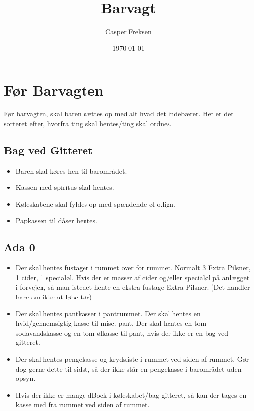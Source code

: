 

\title{Barvagt}
\date{\today}
\author{Casper Freksen}



\maketitle

\section{Før Barvagten}
\label{sec:pre-barvagten}

Før barvagten, skal baren sættes op med alt hvad det indebærer. Her er
det sorteret efter, hvorfra ting skal hentes/ting skal ordnes.

\subsection{Bag ved Gitteret}
\label{sec:pre:bag-ved-gitteret}

\begin{itemize}
\item Baren skal køres hen til barområdet.
\item Kassen med spiritus skal hentes.
\item Køleskabene skal fyldes op med spændende øl
  o.lign. 
\item Papkassen til dåser hentes.
\end{itemize}

\subsection{Ada 0}
\label{sec:pre:ada}

\begin{itemize}
\item Der skal hentes fustager i rummet over for rummet. Normalt 3
  Extra Pilsner, 1 cider, 1 specialøl. Hvis der er masser af cider
  og/eller specialøl på anlægget i forvejen, så man istedet hente en
  ekstra fustage Extra Pilsner. (Det handler bare om ikke at løbe tør).
\item Der skal hentes pantkasser i pantrummet. Der skal hentes en
  hvid/gennemsigtig kasse til misc. pant. Der skal hentes en tom
  sodavandskasse og en tom ølkasse til pant, hvis der ikke er en bag
  ved gitteret.
\item Der skal hentes pengekasse og krydsliste i rummet ved siden af
  rummet. Gør dog gerne dette til sidst, så der ikke står en
  pengekasse i barområdet uden opsyn.
\item Hvis der ikke er mange dBock\texttrademark{} i køleskabet/bag gitteret, så kan
  der tages en kasse med fra rummet ved siden af rummet.
\end{itemize}


